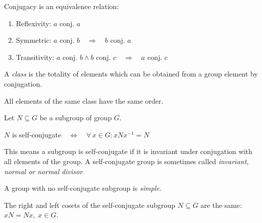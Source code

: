 \begin{thm}\label{thm:14_conj-eqv}
Conjugacy is an equivalence relation:
\begin{enumerate}
	\item Reflexivity: $a$ conj. $a$
	\item Symmetric: $a$ conj. $b \quad \Rightarrow \quad b$ conj. $a$
	\item Transitivity: $a$ conj. $b \wedge b$ conj. $c \quad \Rightarrow \quad a$ conj. $c$
\end{enumerate}
\end{thm}

\begin{dfn}[Class]\label{dfn:15_class}
A \textit{class} is the totality of elements which can be obtained from a group element by conjugation.
\end{dfn}

\begin{thm}\label{thm:15_class-order}
All elements of the same class have the same order. 
\end{thm}

\begin{dfn}\label{dfn:16_self-conj}
Let $N \subseteq G$ be a subgroup of group $G$. \par
$N$  is self-conjugate$\quad \Leftrightarrow \quad \forall \, x \in G: xNx^{-1} = N$ 
\end{dfn}
This means a subgroup is self-conjugate if it is invariant under conjugation with all elements of the group. A self-conjugate group is sometimes called \textit{invariant, normal or normal divisor} 

\begin{dfn}\label{dfn:17_simple-gr}
A group with no self-conjugate subgroup is \textit{simple}.
\end{dfn}

\begin{thm}\label{thm:16_lr-cosets}
The right and left cosets of the self-conjugate subgroup $N \subseteq G$ are the same: $xN = Nx, \; x \in G$. 
\end{thm}




